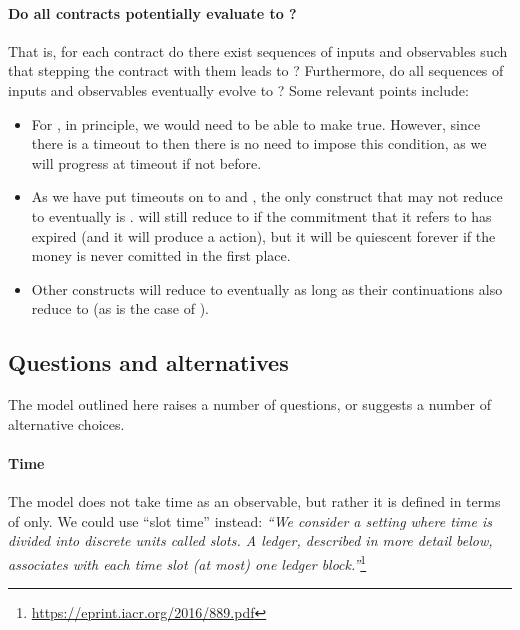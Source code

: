 \documentclass[
      acmsmall
    , screen
    , review=true
  ]{acmart}
\begin{document}
\paragraph{Do all contracts potentially evaluate to ?}

That is, for each contract do there exist sequences of inputs and observables such that stepping the contract with them 
leads to ? Furthermore, do all sequences of inputs and observables eventually evolve to 
? Some relevant points include:
\begin{itemize}
\item For , in principle, we would need to be able to make  
true. However, since there is  a timeout to  then there is no need to impose this condition, as we 
will progress at timeout if not before.
\item As we have put timeouts on to  and , the only construct that may not 
reduce to  eventually is .  will still reduce to 
 if the commitment that it refers to has expired (and it will produce a 
 action), but it will be quiescent forever if the money is never comitted in the first 
place.
\item Other constructs will reduce to  eventually as long as their continuations also reduce to 
 (as is the case of ).
\end{itemize}

\subsection{Questions and alternatives}

The model outlined here raises a number of questions, or suggests a number of alternative choices.

\paragraph{Time}

The model does not take time as an observable, but rather it is defined in terms of  only. We could  use ``slot time'' instead: \emph{``We consider a setting where time is divided into discrete units called slots. A ledger, described in more detail below, associates with each time slot (at most) one ledger block.''}\footnote{\url{https://eprint.iacr.org/2016/889.pdf}}
\end{document}
